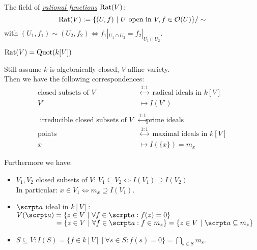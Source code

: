 \begin{defi}
The field of \emph{\underline{rational functions}} $\operatorname{Rat}(V)$:
\[\operatorname{Rat}(V):=\{(U,f) \ | \ U \text{ open in } V, f\in \mathcal{O}(U) \}/ \sim \]
with $(U_1, f_1) \sim (U_2, f_2) \iff f_1|_{U_1 \cap U_2} = f_2|_{U_1 \cap U_2}$.
\end{defi}

\begin{Bem*}
$\operatorname{Rat}(V) = \operatorname{Quot}(k[V])$
\end{Bem*}

\begin{conc}
Still assume $k$ is algebraically closed, $V$ affine variety.\\
Then we have the following correspondences:
\begin{align*}
\text{closed subsets of } V &\stackrel{1:1}{\leftrightarrow} \text{ radical ideals in } k[V]\\
V' &\mapsto I(V')\\
\\
\text{ irreducible closed subsets of } V &\stackrel{1:1}{\leftrightarrow} \text{prime ideals}\\
\text{points} &\stackrel{1:1}{\leftrightarrow} \text{ maximal ideals in } k[V]\\
x &\mapsto I(\{x\})=m_x
\end{align*}

Furthermore we have:
\begin{itemize}
\item $V_1, V_2$ closed subsets of $V$: $V_1 \subseteq V_2 \iff I(V_1) \supseteq I(V_2)$\\
In particular: \hspace*{2cm} $x \in V_1 \iff m_x \supseteq I(V_1)$.
\item $\a$ ideal in $k[V]:$\\
$V(\a)=\{z \in V \ | \ \forall f \in \a: f(z)=0\}$\\
$\hphantom{V(\a)}=\{z \in V \ | \ \forall f \in \a: f \in m_z \} =\{z \in V \ | \ \a \subseteq m_z\}$
\item $S\subseteq V: I(S) = \{f \in k[V] \ | \ \forall s \in S: f(s)=0\}=\bigcap_{s \in S} m_s.$
\end{itemize}
\end{conc}
